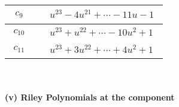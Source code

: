 \documentclass[1p]{elsarticle_modified}
\theoremstyle{definition}
\begin{document}
\begin{tabular}{m{50pt}|m{274pt}}
\hline $$\begin{aligned}c_{9}\end{aligned}$$&$\begin{aligned}
&u^{23}-4 u^{21}+\cdots-11 u-1
\end{aligned}$\\
\hline $$\begin{aligned}c_{10}\end{aligned}$$&$\begin{aligned}
&u^{23}+u^{22}+\cdots-10 u^2+1
\end{aligned}$\\
\hline $$\begin{aligned}c_{11}\end{aligned}$$&$\begin{aligned}
&u^{23}+3 u^{22}+\cdots+4 u^2+1
\end{aligned}$\\
\hline
\end{tabular}\\~\\
\newpage\renewcommand{\arraystretch}{1}
\flushleft \textbf{(v) Riley Polynomials at the component}\newline \\
\end{document}
